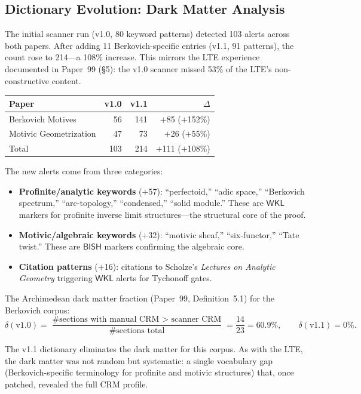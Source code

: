 \documentclass[11pt,a4paper]{article}
\theoremstyle{plain}
\theoremstyle{definition}
\newcommand{\BISH}{\textsf{BISH}}
\newcommand{\WKL}{\textsf{WKL}}
\begin{document}
\subsection{Dictionary Evolution: Dark Matter Analysis}

The initial scanner run (v1.0, 80 keyword patterns) detected 103 alerts across both papers.  After adding 11 Berkovich-specific entries (v1.1, 91 patterns), the count rose to 214---a 108\% increase.  This mirrors the LTE experience documented in Paper~99 (\S5): the v1.0 scanner missed 53\% of the LTE's non-constructive content.

\begin{center}
\begin{tabular}{lrrr}
\toprule
\textbf{Paper} & \textbf{v1.0} & \textbf{v1.1} & \textbf{$\Delta$} \\
\midrule
Berkovich Motives       & 56  & 141 & $+$85 ($+$152\%) \\
Motivic Geometrization  & 47  & 73  & $+$26 ($+$55\%)  \\
\midrule
Total                   & 103 & 214 & $+$111 ($+$108\%) \\
\bottomrule
\end{tabular}
\end{center}

The new alerts come from three categories:
\begin{itemize}
\item \textbf{Profinite/analytic keywords} ($+$57): ``perfectoid,'' ``adic space,'' ``Berkovich spectrum,'' ``arc-topology,'' ``condensed,'' ``solid module.''  These are $\WKL$ markers for profinite inverse limit structures---the structural core of the proof.
\item \textbf{Motivic/algebraic keywords} ($+$32): ``motivic sheaf,'' ``six-functor,'' ``Tate twist.''  These are $\BISH$ markers confirming the algebraic core.
\item \textbf{Citation patterns} ($+$16): citations to Scholze's \emph{Lectures on Analytic Geometry} triggering $\WKL$ alerts for Tychonoff gates.
\end{itemize}

The Archimedean dark matter fraction (Paper~99, Definition~5.1) for the Berkovich corpus:
\[
  \delta(\text{v1.0}) = \frac{\text{\# sections with manual CRM $>$ scanner CRM}}{\text{\# sections total}} = \frac{14}{23} = 60.9\%, \qquad
  \delta(\text{v1.1}) = 0\%.
\]

The v1.1 dictionary eliminates the dark matter for this corpus.  As with the LTE, the dark matter was not random but systematic: a single vocabulary gap (Berkovich-specific terminology for profinite and motivic structures) that, once patched, revealed the full CRM profile.
\end{document}
